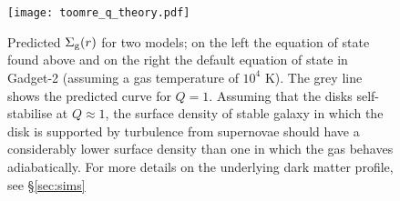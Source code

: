 \begin{figure}[t]
    \centering
    \texttt{[image: toomre\_q\_theory.pdf]}
    \caption{Predicted $\Sigma_\mathrm{g}(r)$ for two models; on the left the equation of state found above and on the right the default equation of state in Gadget-2 (assuming a gas temperature of $10^4$ K). The grey line shows the predicted curve for $Q=1$. Assuming that the disks self-stabilise at $Q\approx1$, the surface density of stable galaxy in which the disk is supported by turbulence from supernovae should have a considerably lower surface density than one in which the gas behaves adiabatically. For more details on the underlying dark matter profile, see \S \ref{sec:sims}}
    \label{fig:toomreqthr}
\end{figure}

